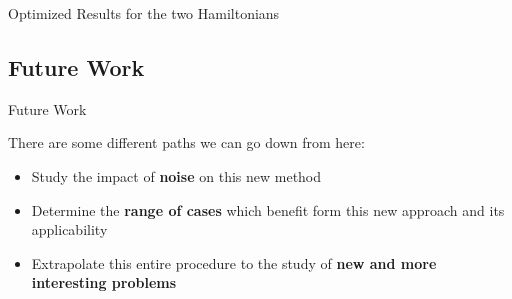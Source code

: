 \documentclass[9pt, handout, aspectratio=169]{beamer}		%
\begin{document}
\begin{frame}{Optimized Results for the two Hamiltonians}
\begin{multicols}{2}
		\end{multicols}

	\end{frame}


	\subsection{Future Work}

	\begin{frame}{Future Work}

		There are some different paths we can go down from here:

		\begin{itemize}
			\item Study the impact of \textbf{noise} on this new method
			\item Determine the \textbf{range of cases} which benefit form this new approach and its applicability
			\item Extrapolate this entire procedure to the study of \textbf{new and more interesting problems}
		\end{itemize}

	\end{frame}

\end{document}
